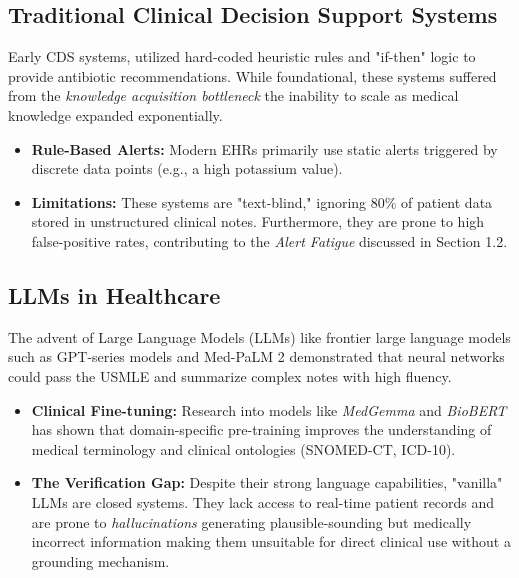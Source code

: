 \subsection{Traditional Clinical Decision Support Systems} Early CDS systems, utilized hard-coded heuristic rules and "if-then" logic to provide antibiotic recommendations. While foundational, these systems suffered from the \textit{knowledge acquisition bottleneck} the inability to scale as medical knowledge expanded exponentially. \begin{itemize} \item \textbf{Rule-Based Alerts:} Modern EHRs primarily use static alerts triggered by discrete data points (e.g., a high potassium value). \item \textbf{Limitations:} These systems are "text-blind," ignoring 80\% of patient data stored in unstructured clinical notes. Furthermore, they are prone to high false-positive rates, contributing to the \textit{Alert Fatigue} discussed in Section 1.2. \end{itemize}

\subsection{LLMs in Healthcare} The advent of Large Language Models (LLMs) like frontier large language models such as GPT-series models and Med-PaLM 2 demonstrated that neural networks could pass the USMLE and summarize complex notes with high fluency. \begin{itemize} \item \textbf{Clinical Fine-tuning:} Research into models like \textit{MedGemma} and \textit{BioBERT} has shown that domain-specific pre-training improves the understanding of medical terminology and clinical ontologies (SNOMED-CT, ICD-10). \item \textbf{The Verification Gap:} Despite their strong language capabilities, "vanilla" LLMs are closed systems. They lack access to real-time patient records and are prone to \textit{hallucinations} generating plausible-sounding but medically incorrect information making them unsuitable for direct clinical use without a grounding mechanism. \end{itemize}

